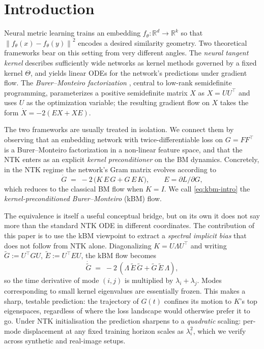 \documentclass[11pt,letterpaper]{article}
\newcommand{\norm}[1]{\left\|#1\right\|}
\newcommand{\R}{\mathbb{R}}
\newcommand{\E}{E}
\newcommand{\Gtilde}{\widetilde{G}}
\newcommand{\Etilde}{\widetilde{\E}}
\begin{document}
\section{Introduction}
\label{sec:intro}

Neural metric learning trains an embedding $f_\theta: \R^d \to \R^k$ so that
$\norm{f_\theta(x) - f_\theta(y)}^2$ encodes a desired similarity geometry.
Two theoretical frameworks bear on this setting from very different angles.
The \emph{neural tangent kernel} \citep{jacot2018neural,lee2019wide} describes
sufficiently wide networks as kernel methods governed by a fixed kernel
$\Theta$, and yields linear ODEs for the network's predictions under
gradient flow. The \emph{Burer--Monteiro factorization}
\citep{burer2003nonlinear,burer2005local}, central to low-rank semidefinite
programming, parameterizes a positive semidefinite matrix $X$ as
$X = UU^\top$ and uses $U$ as the optimization variable; the resulting
gradient flow on $X$ takes the form $\dot{X} = -2(EX + XE)$.

The two frameworks are usually treated in isolation. We connect them by
observing that an embedding network with twice-differentiable loss on
$G = FF^\top$ is a Burer--Monteiro factorization in a non-linear feature
space, and that the NTK enters as an explicit \emph{kernel preconditioner}
on the BM dynamics. Concretely, in the NTK regime the network's Gram matrix
evolves according to
\begin{equation}
\label{eq:kbm-intro}
\dot{G} \;=\; -2\,\bigl(K\,\E\,G + G\,\E\,K\bigr),
\qquad \E = \partial L / \partial G,
\end{equation}
which reduces to the classical BM flow when $K = I$. We call \eqref{eq:kbm-intro}
the \emph{kernel-preconditioned Burer--Monteiro} (kBM) flow.

The equivalence is itself a useful conceptual bridge, but on its own it
does not say more than the standard NTK ODE in different coordinates.
The contribution of this paper is to use the kBM viewpoint to extract a
\emph{spectral implicit bias} that does not follow from NTK alone.
Diagonalizing $K = U\Lambda U^\top$ and writing $\Gtilde := U^\top G U$,
$\Etilde := U^\top \E U$, the kBM flow becomes
\[
\dot{\Gtilde} \;=\; -2\,(\Lambda\,\Etilde\,\Gtilde + \Gtilde\,\Etilde\,\Lambda),
\]
so the time derivative of mode $(i,j)$ is multiplied by $\lambda_i + \lambda_j$.
Modes corresponding to small kernel eigenvalues are essentially frozen.
This makes a sharp, testable prediction: the trajectory of $G(t)$ confines
its motion to $K$'s top eigenspaces, regardless of where the loss landscape
would otherwise prefer it to go. Under NTK initialisation the prediction
sharpens to a \emph{quadratic} scaling: per-mode displacement at any fixed
training horizon scales as $\lambda_i^2$, which we verify across synthetic
and real-image setups.
\end{document}

